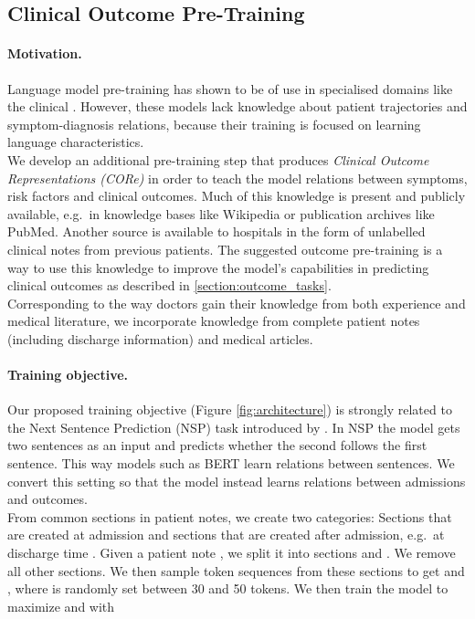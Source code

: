\documentclass[11pt,a4paper]{article}
\begin{document}
\subsection{Clinical Outcome Pre-Training}
\paragraph{Motivation.} 
Language model pre-training has shown to be of use in specialised domains like the clinical \cite{alsentzer-clinical-bert, huang-clinical-bert}. However, these models lack knowledge about patient trajectories and symptom-diagnosis relations, because their training is  focused on learning language characteristics.\\
We develop an additional pre-training step that produces \textit{Clinical Outcome \hbox{Representations} (CORe)} in order to teach the model relations between symptoms, risk factors and clinical outcomes.
Much of this knowledge is present and publicly available, e.g.~in knowledge bases like Wikipedia or publication archives like PubMed. Another source is available to hospitals in the form of unlabelled clinical notes from previous patients. The suggested outcome pre-training is a way to use this knowledge to improve the model's capabilities in predicting clinical outcomes as described in \ref{section:outcome_tasks}.\\
Corresponding to the way doctors gain their knowledge from both experience and medical literature, we incorporate knowledge from complete patient notes (including discharge information) and medical articles.

\paragraph{Training objective.} Our proposed training objective (Figure \ref{fig:architecture}) is strongly related to the Next Sentence Prediction (NSP) task introduced by \citet{bert}. In NSP the model gets two sentences as an input and predicts whether the second follows the first sentence. This way models such as BERT learn relations between sentences. We convert this setting so that the model instead learns relations between admissions and outcomes.\\
From common sections in patient notes, we create two categories: Sections that are created at admission  and sections that are created after admission, e.g.~at discharge time .
Given a patient note , we split it into sections  and . We remove all other sections. We then sample token sequences from these sections to get  and , where  is randomly set between 30 and 50 tokens. We then train the model to maximize  and  with
\end{document}
